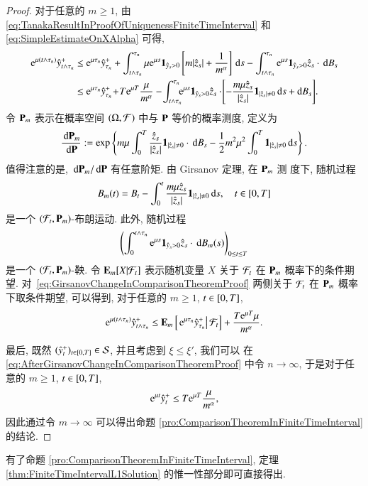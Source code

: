 \begin{proof}
  对于任意的 $m\geq 1$, 由 \eqref{eq:TanakaResultInProofOfUniquenessFiniteTimeInterval}
  和 \eqref{eq:SimpleEstimateOnXAlpha} 可得,
  \begin{align}\label{eq:GirsanovChangeInComparisonTheoremProof}
    \me^{\mu(t\wedge\tau_n)}\hat{y}^+_{t\wedge\tau_n}
    &\leq \me^{\mu\tau_n}\hat{y}^+_{\tau_n}
         +\intT[\tau_n]{t\wedge\tau_n}\mu\me^{\mu s}\one{\hat{y}_s>0}
          \left[
            m|\hat{z}_s|+\frac{1}{m^\alpha}
          \right]\dif s
         -\intT[\tau_n]{t\wedge\tau_n}\me^{\mu s}\one{\hat{y}_s>0}\hat{z}_s\cdot\dif B_s\nonumber\\
    &\leq \me^{\mu\tau_n}\hat{y}^+_{\tau_n}
          \!+\!T\me^{\mu T}\frac{\mu}{m^\alpha}
          -\!\intT[\tau_n]{t\wedge\tau_n}\!\!\!\me^{\mu s}\one{\hat{y}_s>0}\hat{z}_s\cdot\!
          \left[
            -\frac{m\mu\hat{z}_s}{|\hat{z}_s|}\one{|\hat{z}_s|\neq 0}\dif s+\!\dif B_s
          \right]\!.
  \end{align}
  令 $\PR_m$ 表示在概率空间 $(\Omega,\F)$ 中与 $\PR$ 等价的概率测度, 定义为
  \begin{equation*}
    \frac{\dif \PR_m}{\dif \PR}:=\exp
    \left\{
      m\mu\intT{0}\frac{\hat{z}_s}{|\hat{z}_s|}\one{|\hat{z}_s|\neq 0}\cdot\dif B_s
      -\frac{1}{2}m^2\mu^2\intT{0}\one{|\hat{z}_s|\neq 0}\dif s
    \right\}.
  \end{equation*}
  值得注意的是, $\dif\PR_m/\dif\PR$ 有任意阶矩. 由 Girsanov 定理, 在 $\PR_m$ 测
  度下, 随机过程
  $$B_m(t)=B_t-\intT[t]{0}\frac{m\mu\hat{z}_s}{|\hat{z}_s|}\one{|\hat{z}_s|\neq 0}\dif s, \quad t\in\tT$$
  是一个 $(\F_t,\PR_m)$-布朗运动. 此外, 随机过程
  $$\left(\intT[t\wedge\tau_n]{0}\me^{\mu s}\one{\hat{y}_s>0}\hat{z}_s\cdot\dif B_m(s)\right)_{0\leq t\leq T}$$
  是一个 $(\F_t,\PR_m)$-鞅. 令 $\EX_m[X|\F_t]$ 表示随机变量 $X$ 关于 $\F_t$
  在 $\PR_m$ 概率下的条件期望. 对~\eqref{eq:GirsanovChangeInComparisonTheoremProof}
  两侧关于 $\F_t$ 在 $\PR_m$ 概率下取条件期望, 可以得到, 对于任意的 $m\geq 1$, $t\in\tT$,
  \begin{equation}\label{eq:AfterGirsanovChangeInComparisonTheoremProof}
    \me^{\mu(t\wedge\tau_n)}\hat{y}^+_{t\wedge\tau_n}
    \leq \EX_m
         \left[\left.
           \me^{\mu\tau_n}\hat{y}^+_{\tau_n}\right|\F_t
         \right]
         +\frac{T\me^{\mu T}\mu}{m^\alpha}.
  \end{equation}

  最后, 既然 $(\hat{y}^+_t)_{t\in\tT}\in\s$, 并且考虑到 $\xi\leq\xi'$, 我们可以
  在 \eqref{eq:AfterGirsanovChangeInComparisonTheoremProof} 中令 $n\to\infty$,
  于是对于任意的 $m\geq 1$, $t\in\tT$,
  \begin{equation*}
    \me^{\mu t}\hat{y}^+_{t}\leq T\me^{\mu T}\frac{\mu}{m^\alpha},
  \end{equation*}
  因此通过令 $m\to\infty$ 可以得出命题 \ref{pro:ComparisonTheoremInFiniteTimeInterval}
  的结论.
\end{proof}

有了命题 \ref{pro:ComparisonTheoremInFiniteTimeInterval}, 定理 \ref{thm:FiniteTimeIntervalL1Solution}
的惟一性部分即可直接得出.

